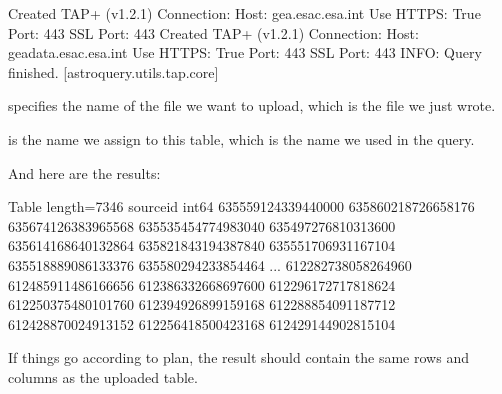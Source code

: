 \documentclass[letterpaper,10pt,english]{sphinxmanual}
\begin{document}
\begin{sphinxVerbatim}[commandchars=\\\{\}]
Created TAP+ (v1.2.1) \PYGZhy{} Connection:
	Host: gea.esac.esa.int
	Use HTTPS: True
	Port: 443
	SSL Port: 443
Created TAP+ (v1.2.1) \PYGZhy{} Connection:
	Host: geadata.esac.esa.int
	Use HTTPS: True
	Port: 443
	SSL Port: 443
INFO: Query finished. [astroquery.utils.tap.core]
\end{sphinxVerbatim}

 specifies the name of the file we want to upload, which is the file we just wrote.

 is the name we assign to this table, which is the name we used in the query.

And here are the results:

\begin{sphinxVerbatim}[commandchars=\\\{\}]
  
\end{sphinxVerbatim}

\begin{sphinxVerbatim}[commandchars=\\\{\}]
\PYGZlt{}Table length=7346\PYGZgt{}
    source\PYGZus{}id     
      int64       
\PYGZhy{}\PYGZhy{}\PYGZhy{}\PYGZhy{}\PYGZhy{}\PYGZhy{}\PYGZhy{}\PYGZhy{}\PYGZhy{}\PYGZhy{}\PYGZhy{}\PYGZhy{}\PYGZhy{}\PYGZhy{}\PYGZhy{}\PYGZhy{}\PYGZhy{}\PYGZhy{}
635559124339440000
635860218726658176
635674126383965568
635535454774983040
635497276810313600
635614168640132864
635821843194387840
635551706931167104
635518889086133376
635580294233854464
               ...
612282738058264960
612485911486166656
612386332668697600
612296172717818624
612250375480101760
612394926899159168
612288854091187712
612428870024913152
612256418500423168
612429144902815104
\end{sphinxVerbatim}

If things go according to plan, the result should contain the same rows and columns as the uploaded table.

\begin{sphinxVerbatim}[commandchars=\\\{\}]
 
\end{sphinxVerbatim}
\end{document}
